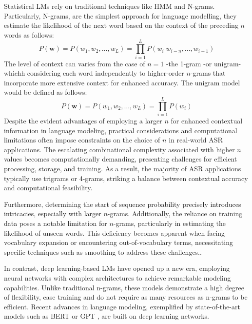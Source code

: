 Statistical \acp{LM} rely on traditional techniques like \ac{HMM} and N-grams. Particularly, N-grams, are the simplest approach for language modelling, they estimate the likelihood of the next word based on the context of the preceding $n$ words as follows:
\begin{equation}
    P(\boldsymbol{w})= P(w_1 , w_2 ,\dots,w_L)  =\prod_{i=1}^L P(w_i| w_{i-n} , \dots,w_{i-1}  )
\end{equation}
The level of context can varies from the case of $n=1$ -the 1-gram -or unigram-  whichh considering each word independently to higher-order $n$-grams that incorporate more extensive context for enhanced accuracy. The unigram model would be defined as follows:
\begin{equation}
    P(\boldsymbol{w})=P(w_1, w_2,\dots,w_L )  = \prod_{i=1}^L P(w_i)
\end{equation}
Despite the evident advantages of employing a larger $n$ for enhanced contextual information in language modeling, practical considerations and computational limitations often impose constraints on the choice of $n$ in real-world \ac{ASR} applications. The escalating combinational complexity associated with higher $n$ values becomes computationally demanding, presenting challenges for efficient processing, storage, and training. As a result, the majority of \ac{ASR} applications typically use trigrams or 4-grams, striking a balance between contextual accuracy and computational feasibility.

Furthermore, determining the start of sequence probability precisely introduces intricacies, especially with larger $n$-grams. Additionally, the reliance on training data poses a notable limitation for $n$-grams, particularly in estimating the likelihood of unseen words. This deficiency becomes apparent when facing vocabulary expansion or encountering out-of-vocabulary terms, necessitating specific techniques such as smoothing to address these challenges.\cite{n-grams-smoothing}.

In contrast, deep learning-based \acp{LM} have opened up a new era, employing neural networks with complex architectures to achieve remarkable modeling capabilities. Unlike traditional n-grams, these models demonstrate a high degree of flexibility, ease training and do not require as many resources as n-grams to be efficient. Recent advances in language modeling, exemplified by state-of-the-art models such as \ac{BERT} \cite{Bert} or \ac{GPT} \cite{brown2020language}, are built on deep learning networks.


